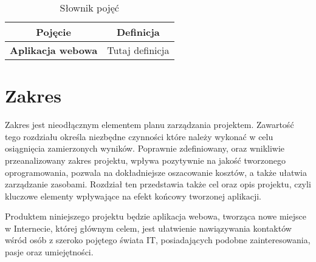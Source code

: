 \documentclass[12pt,a4paper]{article}
\begin{document}
\begin{table}[htb]
\centering
  \begin{tabular}{c|c}
  \hline
  {\bf Pojęcie} & {\bf Definicja} \\
  \hline
  \textbf{Aplikacja webowa} & Tutaj definicja\\
  \hline
  \end{tabular}
\caption{Słownik pojęć}
\label{tab:slownik}
\end{table}

\newpage

\section{Zakres}

Zakres jest nieodłącznym elementem planu zarządzania projektem. Zawartość tego rozdziału określa niezbędne czynności które należy wykonać w celu osiągnięcia zamierzonych wyników. Poprawnie zdefiniowany, oraz wnikliwie przeanalizowany zakres projektu, wpływa pozytywnie na jakość tworzonego oprogramowania, pozwala na dokładniejsze oszacowanie kosztów, a także ułatwia zarządzanie zasobami. Rozdział ten przedstawia także cel oraz opis projektu, czyli kluczowe elementy wpływające na efekt końcowy tworzonej aplikacji.  

Produktem niniejszego projektu będzie aplikacja webowa, tworząca nowe miejsce w Internecie, której głównym celem, jest ułatwienie nawiązywania kontaktów wśród osób z szeroko pojętego świata IT, posiadających podobne zainteresowania, pasje oraz umiejętności. 
\end{document}
